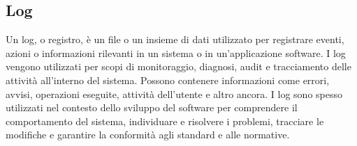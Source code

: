 \vspace{2em}
\subsection*{Log}
\par Un log, o registro, è un file o un insieme di dati utilizzato per registrare eventi, azioni o informazioni rilevanti in un sistema o in un'applicazione software. I log vengono utilizzati per scopi di monitoraggio, diagnosi, audit e tracciamento delle attività all'interno del sistema. Possono contenere informazioni come errori, avvisi, operazioni eseguite, attività dell'utente e altro ancora. I log sono spesso utilizzati nel contesto dello sviluppo del software per comprendere il comportamento del sistema, individuare e risolvere i problemi, tracciare le modifiche e garantire la conformità agli standard e alle normative.
